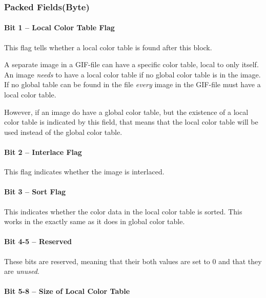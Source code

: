   \subsubsection{Packed Fields(Byte)}

  \paragraph{Bit 1 -- Local Color Table Flag}

  This flag tells whether a local color table is found after this
  block.

  A separate image in a GIF-file can have a specific color table,
  local to only itself. An image \textit{needs} to have a local color
  table if no global color table is in the image. If no global table
  can be found in the file \textit{every} image in the GIF-file must
  have a local color table.

  However, if an image do have a global color table, but the existence
  of a local color table is indicated by this field, that means that
  the local color table will be used instead of the global color
  table.

  \paragraph{Bit 2 -- Interlace Flag}

  This flag indicates whether the image is interlaced.


  \paragraph{Bit 3 -- Sort Flag}

  This indicates whether the color data in the local color table is
  sorted. This works in the exactly same as it does in global color
  table.

  \paragraph{Bit 4-5 -- Reserved}

  These bits are reserved, meaning that their both values are set to
  $0$ and that they are \textit{unused}.

  \paragraph{Bit 5-8 -- Size of Local Color Table}

